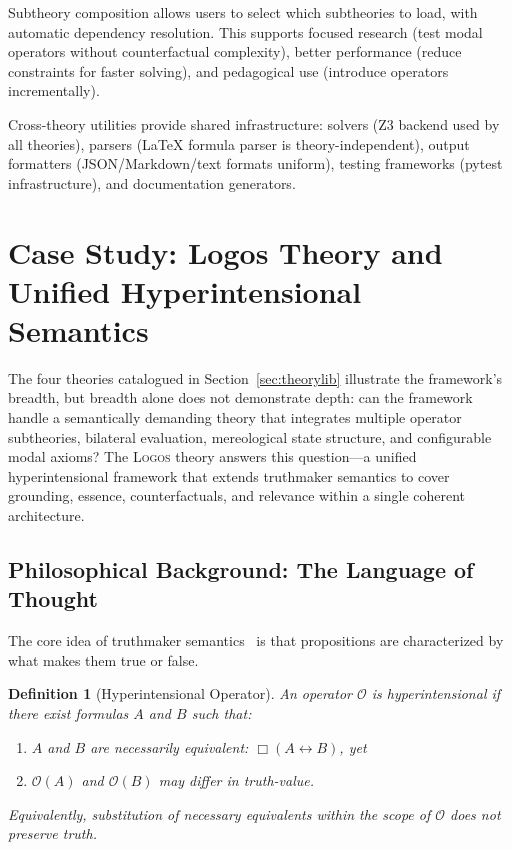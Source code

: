 \documentclass[pdflatex,sn-mathphys-num]{sn-jnl}
\newcommand{\nec}{\Box}                     %
\newcommand{\theorylogos}{\textsc{Logos}}
\theoremstyle{thmstyleone}
\theoremstyle{thmstyletwo}
\theoremstyle{thmstylethree}
\newtheorem{definition}{Definition}
\begin{document}
Subtheory composition allows users to select which subtheories to load, with automatic dependency resolution.
This supports focused research (test modal operators without counterfactual complexity), better performance (reduce constraints for faster solving), and pedagogical use (introduce operators incrementally).

Cross-theory utilities provide shared infrastructure: solvers (Z3 backend used by all theories), parsers (\LaTeX{} formula parser is theory-independent), output formatters (JSON/Markdown/text formats uniform), testing frameworks (pytest infrastructure), and documentation generators.


\section{Case Study: Logos Theory and Unified Hyperintensional Semantics}\label{sec:logos}

The four theories catalogued in Section~\ref{sec:theorylib} illustrate the framework's breadth, but breadth alone does not demonstrate depth: can the framework handle a semantically demanding theory that integrates multiple operator subtheories, bilateral evaluation, mereological state structure, and configurable modal axioms?
The \theorylogos{} theory answers this question---a unified hyperintensional framework that extends truthmaker semantics to cover grounding, essence, counterfactuals, and relevance within a single coherent architecture.

\subsection{Philosophical Background: The Language of Thought}\label{sec:philosophical-background}

The core idea of truthmaker semantics~\cite{fine2017tms} is that propositions are characterized by what makes them true or false.

\begin{definition}[Hyperintensional Operator]\label{def:hyperintensional}
An operator $\mathcal{O}$ is \emph{hyperintensional} if there exist formulas $A$ and $B$ such that:
\begin{enumerate}
    \item $A$ and $B$ are necessarily equivalent: $\nec(A \leftrightarrow B)$, yet
    \item $\mathcal{O}(A)$ and $\mathcal{O}(B)$ may differ in truth-value.
\end{enumerate}
Equivalently, substitution of necessary equivalents within the scope of $\mathcal{O}$ does not preserve truth.
\end{definition}
\end{document}
